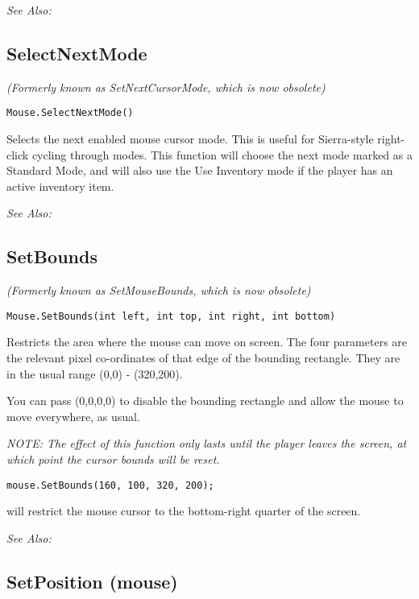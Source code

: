 \it{See Also:} 


\subsection{SelectNextMode}\label{Mouse.SelectNextMode}%

\it{(Formerly known as SetNextCursorMode, which is now obsolete)}

\begin{verbatim}
Mouse.SelectNextMode()
\end{verbatim}
Selects the next enabled mouse cursor mode. This is useful for Sierra-style right-click
cycling through modes. This function will choose the next mode marked as a Standard Mode, and
will also use the Use Inventory mode if the player has an active inventory item.

\it{See Also:} 


\subsection{SetBounds}\label{Mouse.SetBounds}%

\it{(Formerly known as SetMouseBounds, which is now obsolete)}

\begin{verbatim}
Mouse.SetBounds(int left, int top, int right, int bottom)
\end{verbatim}

Restricts the area where the mouse can move on screen. The four parameters are
the relevant pixel co-ordinates of that edge of the bounding rectangle. They are
in the usual range (0,0) - (320,200).

You can pass (0,0,0,0) to disable the bounding rectangle and allow the mouse to move
everywhere, as usual.

\it{NOTE:} The effect of this function only lasts until the player leaves the screen,
at which point the cursor bounds will be reset.

\begin{verbatim}
mouse.SetBounds(160, 100, 320, 200);
\end{verbatim}
will restrict the mouse cursor to the bottom-right quarter of the screen.

\it{See Also:} 


\subsection{SetPosition (mouse)}\label{Mouse.SetPosition}%


